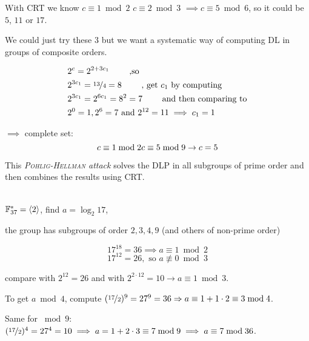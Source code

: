 With \textsc{CRT} we know $c \equiv 1 \bmod 2$ $c \equiv 2 \bmod 3$ $\implies c \equiv 5 \bmod 6$, so it could be $5$, $11$ or $17$.

We could just try these $3$ but we want a systematic way of computing \textsc{DL} in groups of composite orders.

\begin{align*}
&2^c = 2^{2+3 c_1} \qquad \text{ ,so} \\
&2^{3c_1} = \nicefrac{13}{4} = 8 \qquad \text{ , get } c_1 \text{ by computing} \\
&2^{3c_1 } =2^{6c_1} = 8^2 = 7 \qquad \text{ and then comparing to} \\
&2^0 = 1, 2^6 = 7 \text{ and } 2^{12}=11 \implies c_1=1
\end{align*}

$\implies$ complete set:
\[
c \equiv 1 \bmod 2 \\
c \equiv 5 \bmod 9 \\
\rightarrow c = 5
\]

This \emph{\textsc{Pohlig-Hellman} attack} solves the \textsc{DLP} in all subgroups of prime order and then combines the results using \textsc{CRT}.

\begin{example}\ \\
$\mathbb{F}_{37}^{\ast} = \langle 2 \rangle$, find $a = \log_2 17$,

the group has subgroups of order $2,3,4,9$ (and others of non-prime order)

\[
	17^{18} = 36 \implies a \equiv 1 \bmod 2
\]
\[
	17^{12} = 26, \text{ so } a \not\equiv 0 \bmod 3
\]

compare with $2^{12} = 26$ and with $2^{2 \cdot 12} = 10 \rightarrow a \equiv 1 \bmod 3$.

To get $a \bmod 4$, compute $(\nicefrac{17}{2})^9 = 27^9 = 36 \Rightarrow a \equiv 1 + 1 \cdot 2 \equiv 3 \bmod 4$.

Same for $\bmod 9$: $(\nicefrac{17}{2})^4 = 27^4 = 10 \implies a =1+2 \cdot 3 \equiv 7 \bmod 9 \implies a \equiv 7 \bmod 36$.

\end{example}